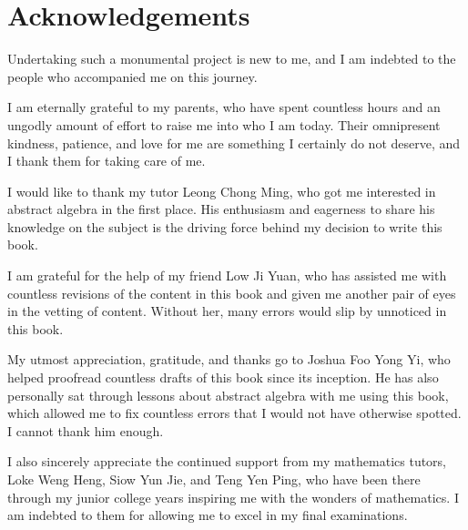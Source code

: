\vspace*{\fill}

\begin{center}
    \fontsize{8pt}{8pt}\selectfont
\end{center}

\newpage

\createtoc

\chapter{Acknowledgements}
Undertaking such a monumental project is new to me, and I am indebted to the people who accompanied me on this journey.

I am eternally grateful to my parents, who have spent countless hours and an ungodly amount of effort to raise me into who I am today. Their omnipresent kindness, patience, and love for me are something I certainly do not deserve, and I thank them for taking care of me.

I would like to thank my tutor Leong Chong Ming, who got me interested in abstract algebra in the first place. His enthusiasm and eagerness to share his knowledge on the subject is the driving force behind my decision to write this book.

I am grateful for the help of my friend Low Ji Yuan, who has assisted me with countless revisions of the content in this book and given me another pair of eyes in the vetting of content. Without her, many errors would slip by unnoticed in this book.

My utmost appreciation, gratitude, and thanks go to Joshua Foo Yong Yi, who helped proofread countless drafts of this book since its inception. He has also personally sat through lessons about abstract algebra with me using this book, which allowed me to fix countless errors that I would not have otherwise spotted. I cannot thank him enough.

I also sincerely appreciate the continued support from my mathematics tutors, Loke Weng Heng, Siow Yun Jie, and Teng Yen Ping, who have been there through my junior college years inspiring me with the wonders of mathematics. I am indebted to them for allowing me to excel in my final examinations.

